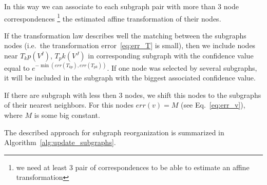 \documentclass[
	fontsize=12pt,
	paper=a4,
	twoside=false,
	numbers=noenddot,
	plainheadsepline,
	toc=listof,
	toc=bibliography
]{scrartcl}
\begin{document}
In this way we can associate to each subgraph pair with more than $3$ node correspondences \footnote{we need at least $3$ pair of correspondences to be able to estimate an affine transformation} the estimated affine transformation of their nodes.

If the transformation law describes well the matching between the subgraphs nodes (i.e.\ the transformation error~\ref{eq:err_T} is small), then we include nodes near $T_kp(V^I)$, $T_pk(V^J)$ in corresponding subgraph with the confidence value equal to $e^{-\min(err(T_{kp}), err(T_{pk}))}$. If one node was selected by several subgraphs, it will be included in the subgraph with the biggest associated confidence value.

If there are subgraph with less then $3$ nodes, we shift this nodes to the subgraphs of their nearest neighbors. For this nodes $err(v)=M$ (see Eq.~\ref{eq:err_v}), where $M$ is some big constant. 

The described approach for subgraph reorganization is summarized in Algorithm~\ref{alg:update_subgraphs}.
\end{document}
